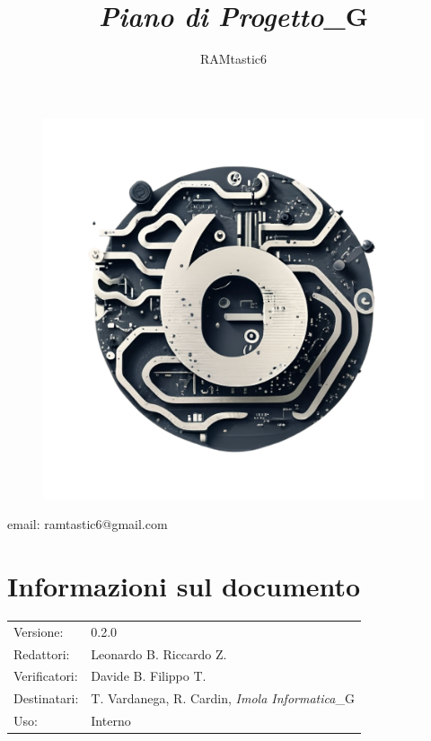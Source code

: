 \documentclass[12pt, oneside]{article}
\author{RAMtastic6}
\begin{document}
\thispagestyle{empty}
\title{\textit{Piano di Progetto}_G}
\maketitle
\begin{figure}[h]
  \centering
  \includegraphics[scale=0.3]{logo.png}
\end{figure}
\begin{center}
    email: ramtastic6@gmail.com
\end{center}

\section*{Informazioni sul documento}
\begin{tabular}{ll}
Versione: & 0.2.0 \\
Redattori: & Leonardo B. Riccardo Z.\\
Verificatori: & Davide B. Filippo T.\\ 
Destinatari: & T. Vardanega, R. Cardin, \textit{Imola Informatica}_G \\
Uso: & Interno
\end{tabular}
\newpage

\end{document}
